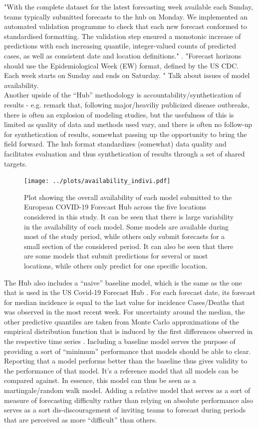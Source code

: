 "With the complete dataset for the latest forecasting week available each Sunday, teams typically
submitted forecasts to the hub on Monday. We implemented an automated validation
programme to check that each new forecast conformed to standardised formatting. The
validation step ensured a monotonic increase of predictions with each increasing quantile,
integer-valued counts of predicted cases, as well as consistent date and location definitions." \citep{sherratt_draft_nodate}.
"Forecast horizons should use the Epidemiological Week (EW) format, defined by the US CDC. Each week starts on Sunday and ends on Saturday. "
Talk about issues of model availability.\\
Another upside of the ``Hub'' methodology is accountability/synthetication of results - e.g. \cite{metcalf_opportunities_2017} remark that, following major/heaviliy publicized disease outbreaks, there is often an explosion of modeling studies, but the usefulness of this is limited as quality of data and methods used vary, and there is often no follow-up for synthetication of results, somewhat passing up the opportunity to bring the field forward. The hub format standardizes (somewhat) data quality and facilitates evaluation and thus synthetication of results through a set of shared targets. 
\begin{figure}
\texttt{[image: ../plots/availability\_indivi.pdf]}
\caption{Plot showing the overall availability of each model submitted to the European COVID-19 Forecast Hub across the five locations considered in this study. It can be seen that there is large variability in the availability of each model. Some models are available during most of the study period, while others only submit forecasts for a small section of the considered period. It can also be seen that there are some models that submit predictions for several or most locations, while others only predict for one specific location.}
\end{figure}
The Hub also includes a ``naive'' baseline model, which is the same as the one that is used in the US Covid-19 Forecast Hub . For each forecast date, its forecast for median incidence is equal to the last value for incidence Cases/Deaths that was observed in the most recent week. For uncertainty around the median, the other predictive quantiles are taken from Monte Carlo approximations of the empirical distribution function that is induced by the first differences observed in the respective time series \citep{cramer_evaluation_2022}. Including a baseline model serves the purpose of providing a sort of ``minimum'' performance that models should be able to clear. Reporting that a model performs better than the baseline thus gives validity to the performance of that model. It's a reference model that all models can be compared against. In essence, this model can thus be seen as a martingale/random walk model. Adding a relative model that serves as a sort of measure of forecasting difficulty rather than relying on absolute performance also serves as a sort dis-discouragement of inviting teams to forecast during periods that are perceived as more ``difficult'' than others.\\
